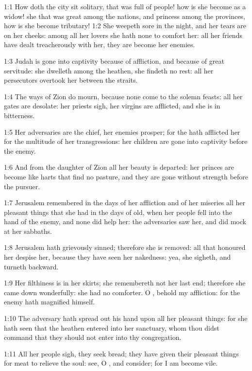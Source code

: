 

1:1 How doth the city sit solitary, that was full of people! how is
she become as a widow! she that was great among the nations, and
princess among the provinces, how is she become tributary!  1:2 She
weepeth sore in the night, and her tears are on her cheeks: among all
her lovers she hath none to comfort her: all her friends have dealt
treacherously with her, they are become her enemies.

1:3 Judah is gone into captivity because of affliction, and because of
great servitude: she dwelleth among the heathen, she findeth no rest:
all her persecutors overtook her between the straits.

1:4 The ways of Zion do mourn, because none come to the solemn feasts:
all her gates are desolate: her priests sigh, her virgins are
afflicted, and she is in bitterness.

1:5 Her adversaries are the chief, her enemies prosper; for the \LORD
hath afflicted her for the multitude of her transgressions: her
children are gone into captivity before the enemy.

1:6 And from the daughter of Zion all her beauty is departed: her
princes are become like harts that find no pasture, and they are gone
without strength before the pursuer.

1:7 Jerusalem remembered in the days of her affliction and of her
miseries all her pleasant things that she had in the days of old, when
her people fell into the hand of the enemy, and none did help her: the
adversaries saw her, and did mock at her sabbaths.

1:8 Jerusalem hath grievously sinned; therefore she is removed: all
that honoured her despise her, because they have seen her nakedness:
yea, she sigheth, and turneth backward.

1:9 Her filthiness is in her skirts; she remembereth not her last end;
therefore she came down wonderfully: she had no comforter. O \LORD,
behold my affliction: for the enemy hath magnified himself.

1:10 The adversary hath spread out his hand upon all her pleasant
things: for she hath seen that the heathen entered into her sanctuary,
whom thou didst command that they should not enter into thy
congregation.

1:11 All her people sigh, they seek bread; they have given their
pleasant things for meat to relieve the soul: see, O \LORD, and
consider; for I am become vile.

